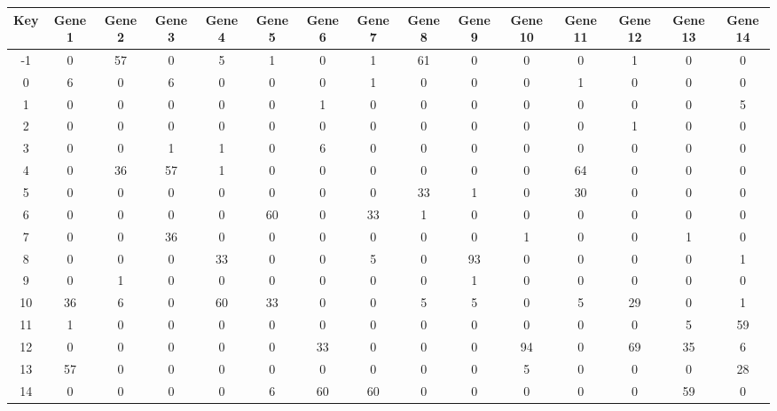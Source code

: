 \begin{tabular}{|c|c|c|c|c|c|c|c|c|c|c|c|c|c|c|}
\hline
Key & Gene 1 & Gene 2 & Gene 3 & Gene 4 & Gene 5 & Gene 6 & Gene 7 & Gene 8 & Gene 9 & Gene 10 & Gene 11 & Gene 12 & Gene 13 & Gene 14 \\
\hline
-1 & 0 & 57 & 0 & 5 & 1 & 0 & 1 & 61 & 0 & 0 & 0 & 1 & 0 & 0 \\
0 & 6 & 0 & 6 & 0 & 0 & 0 & 1 & 0 & 0 & 0 & 1 & 0 & 0 & 0 \\
1 & 0 & 0 & 0 & 0 & 0 & 1 & 0 & 0 & 0 & 0 & 0 & 0 & 0 & 5 \\
2 & 0 & 0 & 0 & 0 & 0 & 0 & 0 & 0 & 0 & 0 & 0 & 1 & 0 & 0 \\
3 & 0 & 0 & 1 & 1 & 0 & 6 & 0 & 0 & 0 & 0 & 0 & 0 & 0 & 0 \\
4 & 0 & 36 & 57 & 1 & 0 & 0 & 0 & 0 & 0 & 0 & 64 & 0 & 0 & 0 \\
5 & 0 & 0 & 0 & 0 & 0 & 0 & 0 & 33 & 1 & 0 & 30 & 0 & 0 & 0 \\
6 & 0 & 0 & 0 & 0 & 60 & 0 & 33 & 1 & 0 & 0 & 0 & 0 & 0 & 0 \\
7 & 0 & 0 & 36 & 0 & 0 & 0 & 0 & 0 & 0 & 1 & 0 & 0 & 1 & 0 \\
8 & 0 & 0 & 0 & 33 & 0 & 0 & 5 & 0 & 93 & 0 & 0 & 0 & 0 & 1 \\
9 & 0 & 1 & 0 & 0 & 0 & 0 & 0 & 0 & 1 & 0 & 0 & 0 & 0 & 0 \\
10 & 36 & 6 & 0 & 60 & 33 & 0 & 0 & 5 & 5 & 0 & 5 & 29 & 0 & 1 \\
11 & 1 & 0 & 0 & 0 & 0 & 0 & 0 & 0 & 0 & 0 & 0 & 0 & 5 & 59 \\
12 & 0 & 0 & 0 & 0 & 0 & 33 & 0 & 0 & 0 & 94 & 0 & 69 & 35 & 6 \\
13 & 57 & 0 & 0 & 0 & 0 & 0 & 0 & 0 & 0 & 5 & 0 & 0 & 0 & 28 \\
14 & 0 & 0 & 0 & 0 & 6 & 60 & 60 & 0 & 0 & 0 & 0 & 0 & 59 & 0 \\
\hline
\end{tabular}